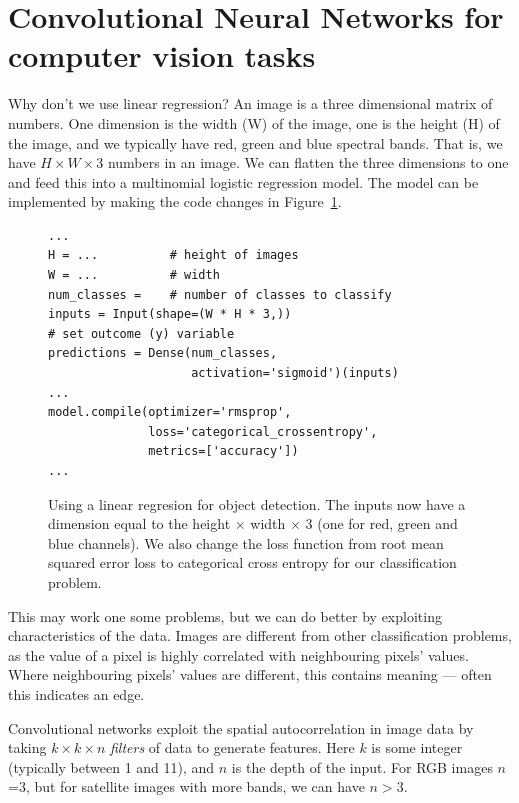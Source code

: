 \documentclass[12pt, a4paper, oneside, headinclude, footinclude]{article}
\begin{document}
\section{Convolutional Neural Networks for computer vision tasks}

Why don't we use linear regression?  An image is a three dimensional matrix of
numbers. One dimension is the width (W) of the image, one is the height (H) of
the image, and we typically have red, green and blue spectral bands. That is,
we have $H\times W \times 3$ numbers in an image. We can flatten the three
dimensions to one and feed this into a multinomial logistic regression model.
The model can be implemented by making the code changes in
Figure~\ref{alg:linearimage}.

\begin{figure}
\begin{verbatim}
...
H = ...          # height of images
W = ...          # width
num_classes =    # number of classes to classify  
inputs = Input(shape=(W * H * 3,))
# set outcome (y) variable
predictions = Dense(num_classes, 
                    activation='sigmoid')(inputs)
...
model.compile(optimizer='rmsprop', 
              loss='categorical_crossentropy', 
              metrics=['accuracy'])
...
\end{verbatim}
    \caption[Using a linear regression for object detection]{Using a linear
    regresion for object detection. The inputs now have a dimension equal to
    the height $\times$ width $\times$ 3 (one for red, green and blue
    channels). We also change the loss function from root mean squared error
    loss to categorical cross entropy for our classification problem.
\label{alg:linearimage}} \end{figure}
This may work one some problems, but we can do better by exploiting
characteristics of the data. Images are different from other classification
problems, as the value of a pixel is highly correlated with neighbouring
pixels' values. Where neighbouring pixels' values are different, this contains
meaning --- often this indicates an edge.

Convolutional networks exploit the spatial autocorrelation in image data by
taking $k\times k \times n$ \textit{filters} of data to generate features.
Here $k$ is some integer (typically between 1 and 11), and $n$ is the depth of
the input.  For RGB images $n$=3, but for satellite images with more bands, we
can have $n>3$. 

\end{document}
